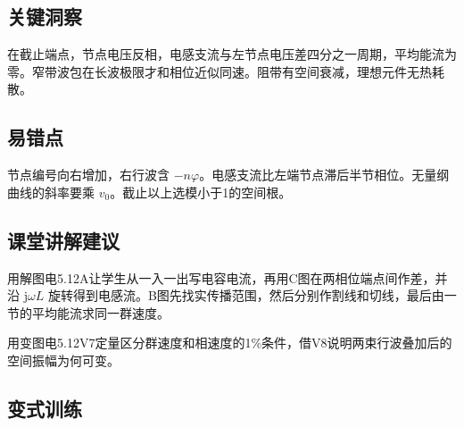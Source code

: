 \documentclass[UTF8,fontset=fandol,a4paper,11pt]{ctexart}
\begin{document}


\subsection*{关键洞察}

在截止端点，节点电压反相，电感支流与左节点电压差四分之一周期，平均能流为零。窄带波包在长波极限才和相位近似同速。阻带有空间衰减，理想元件无热耗散。



\subsection*{易错点}

节点编号向右增加，右行波含 $-n\varphi$。电感支流比左端节点滞后半节相位。无量纲曲线的斜率要乘 $v_0$。截止以上选模小于1的空间根。



\subsection*{课堂讲解建议}

用解图电5.12A让学生从一入一出写电容电流，再用C图在两相位端点间作差，并沿 $\mathrm j\omega L$ 旋转得到电感流。B图先找实传播范围，然后分别作割线和切线，最后由一节的平均能流求同一群速度。

用变图电5.12V7定量区分群速度和相速度的1\%条件，借V8说明两束行波叠加后的空间振幅为何可变。


\subsection*{变式训练}
\end{document}
